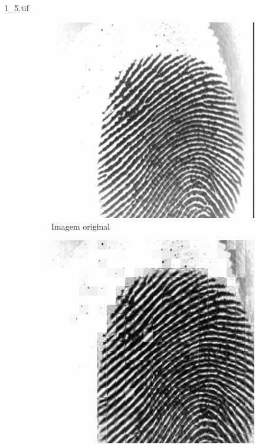 \documentclass{beamer}
\begin{document}
    \begin{frame}{1\_5.tif}
        \begin{figure}
            \centering
            \begin{subfigure}[!ht]{0.32\textwidth}
                \includegraphics[width=\columnwidth]{Fingerprints/1_5.jpg}
                \caption{Imagem original}
            \end{subfigure}
            \begin{subfigure}[!ht]{0.32\textwidth}
                \includegraphics[width=\columnwidth]{Fingerprints/1_5_intermediate.jpg}

\end{subfigure}
\end{figure}
\end{frame}
\end{document}
